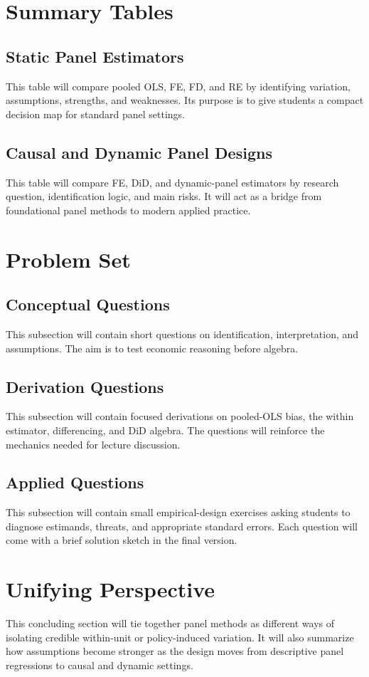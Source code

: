 \section{Summary Tables}

\subsection{Static Panel Estimators}
This table will compare pooled OLS, FE, FD, and RE by identifying variation, assumptions, strengths, and weaknesses. Its purpose is to give students a compact decision map for standard panel settings.

\subsection{Causal and Dynamic Panel Designs}
This table will compare FE, DiD, and dynamic-panel estimators by research question, identification logic, and main risks. It will act as a bridge from foundational panel methods to modern applied practice.

\section{Problem Set}

\subsection{Conceptual Questions}
This subsection will contain short questions on identification, interpretation, and assumptions. The aim is to test economic reasoning before algebra.

\subsection{Derivation Questions}
This subsection will contain focused derivations on pooled-OLS bias, the within estimator, differencing, and DiD algebra. The questions will reinforce the mechanics needed for lecture discussion.

\subsection{Applied Questions}
This subsection will contain small empirical-design exercises asking students to diagnose estimands, threats, and appropriate standard errors. Each question will come with a brief solution sketch in the final version.

\section{Unifying Perspective}
This concluding section will tie together panel methods as different ways of isolating credible within-unit or policy-induced variation. It will also summarize how assumptions become stronger as the design moves from descriptive panel regressions to causal and dynamic settings.


